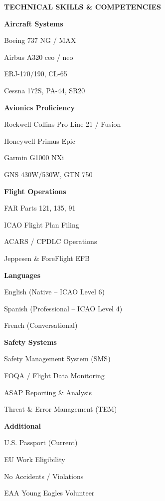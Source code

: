 \documentclass[11pt,a4paper]{article}
\newcommand{\sectionbar}[1]{%
  \vspace{0.35cm}%
  \noindent%
  \begin{tcolorbox}[
    enhanced,
    colback=primaryblue,
    colframe=primaryblue,
    boxrule=0pt,
    left=10pt,
    right=10pt,
    top=5pt,
    bottom=5pt,
    sharp corners,
    before skip=0pt,
    after skip=5pt,
  ]
  \color{white}\bfseries\large\MakeUppercase{#1}
  \end{tcolorbox}%
}
\begin{document}
\sectionbar{Technical Skills \& Competencies}

\vspace{-2pt}
\noindent
\begin{minipage}[t]{0.32\textwidth}
\raggedright
\footnotesize
\textbf{\color{primaryblue}Aircraft Systems}\par
Boeing 737 NG / MAX\par
Airbus A320 ceo / neo\par
ERJ-170/190, CL-65\par
Cessna 172S, PA-44, SR20
\end{minipage}%
\hfill
\begin{minipage}[t]{0.32\textwidth}
\raggedright
\footnotesize
\textbf{\color{primaryblue}Avionics Proficiency}\par
Rockwell Collins Pro Line 21 / Fusion\par
Honeywell Primus Epic\par
Garmin G1000 NXi\par
GNS 430W/530W, GTN 750
\end{minipage}%
\hfill
\begin{minipage}[t]{0.32\textwidth}
\raggedright
\footnotesize
\textbf{\color{primaryblue}Flight Operations}\par
FAR Parts 121, 135, 91\par
ICAO Flight Plan Filing\par
ACARS / CPDLC Operations\par
Jeppesen \& ForeFlight EFB
\end{minipage}

\vspace{8pt}
\noindent
\begin{minipage}[t]{0.32\textwidth}
\raggedright
\footnotesize
\textbf{\color{primaryblue}Languages}\par
English (Native -- ICAO Level 6)\par
Spanish (Professional -- ICAO Level 4)\par
French (Conversational)
\end{minipage}%
\hfill
\begin{minipage}[t]{0.32\textwidth}
\raggedright
\footnotesize
\textbf{\color{primaryblue}Safety Systems}\par
Safety Management System (SMS)\par
FOQA / Flight Data Monitoring\par
ASAP Reporting \& Analysis\par
Threat \& Error Management (TEM)
\end{minipage}%
\hfill
\begin{minipage}[t]{0.32\textwidth}
\raggedright
\footnotesize
\textbf{\color{primaryblue}Additional}\par
U.S. Passport (Current)\par
EU Work Eligibility\par
No Accidents / Violations\par
EAA Young Eagles Volunteer
\end{minipage}
\end{document}
